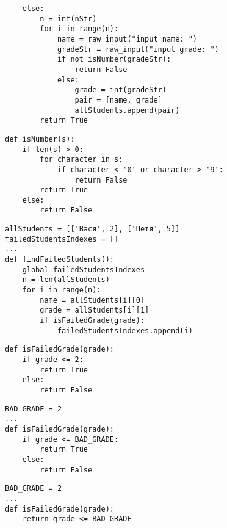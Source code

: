 {\begin{frame}[fragile]
  \begin{verbatim}
    else:
        n = int(nStr)
        for i in range(n):
            name = raw_input("input name: ")
            gradeStr = raw_input("input grade: ")
            if not isNumber(gradeStr):
                return False
            else:
                grade = int(gradeStr)
                pair = [name, grade]
                allStudents.append(pair)
        return True
  \end{verbatim}
\end{frame}

\begin{frame}[fragile]
  \begin{verbatim}
def isNumber(s):
    if len(s) > 0:
        for character in s:
            if character < '0' or character > '9':
                return False
        return True
    else:
        return False
  \end{verbatim}
\end{frame}

\begin{frame}[fragile]
  \begin{verbatim}
allStudents = [['Вася', 2], ['Петя', 5]]
failedStudentsIndexes = []
...
def findFailedStudents():
    global failedStudentsIndexes
    n = len(allStudents)
    for i in range(n):
        name = allStudents[i][0]
        grade = allStudents[i][1]
        if isFailedGrade(grade):
            failedStudentsIndexes.append(i)
  \end{verbatim}
\end{frame}

\begin{frame}[fragile]
  \begin{verbatim}
def isFailedGrade(grade):
    if grade <= 2:
        return True
    else:
        return False
  \end{verbatim}
\end{frame}

\begin{frame}[fragile]
  \begin{verbatim}
BAD_GRADE = 2
...
def isFailedGrade(grade):
    if grade <= BAD_GRADE:
        return True
    else:
        return False
  \end{verbatim}
\end{frame}

\begin{frame}[fragile]
  \begin{verbatim}
BAD_GRADE = 2
...
def isFailedGrade(grade):
    return grade <= BAD_GRADE
  \end{verbatim}
\end{frame}

}
